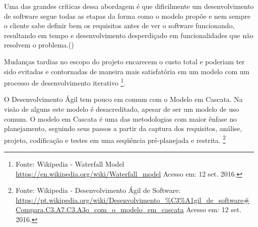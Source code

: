 \par Uma das grandes críticas dessa abordagem é que dificilmente um desenvolvimento de software segue todas as etapas da forma como o modelo propõe  e nem sempre o cliente sabe definir bem os requisitos antes de ver o software funcionando, resultando em tempo e desenvolvimento desperdiçado em funcionalidades que não resolvem o problema.(\cite{pressman:11})
\par Mudanças tardias no escopo do projeto encarecem o custo total e poderiam ter sido evitadas e contornadas de maneira mais satisfatória em um modelo com um processo de desenvolvimento iterativo \footnote{ Fonte: Wikipedia - Waterfall Model \url {https://en.wikipedia.org/wiki/Waterfall_model} Acesso em: 12 set. 2016.}.
\par O Desenvolvimento Ágil tem pouco em comum com o Modelo em Cascata. Na visão de alguns este modelo é desacreditado, apesar de ser um modelo de uso comum. O modelo em Cascata é uma das metodologias com maior ênfase no planejamento, seguindo seus passos a partir da captura dos requisitos, análise, projeto, codificação e testes em uma seqüência pré-planejada e restrita. \footnote {Fonte: Wikipedia - Desenvolvimento Ágil de Software: \url{https://pt.wikipedia.org/wiki/Desenvolvimento_\%C3\%A1gil_de_software#Compara.C3.A7.C3.A3o_com_o_modelo_em_cascata} Acesso em: 12 set. 2016.}
